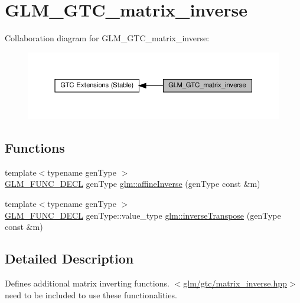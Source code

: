 \hypertarget{group__gtc__matrix__inverse}{}\section{G\+L\+M\+\_\+\+G\+T\+C\+\_\+matrix\+\_\+inverse}
\label{group__gtc__matrix__inverse}
Collaboration diagram for G\+L\+M\+\_\+\+G\+T\+C\+\_\+matrix\+\_\+inverse\+:\nopagebreak
\begin{figure}[H]
\begin{center}
\leavevmode
\includegraphics[width=350pt]{group__gtc__matrix__inverse}
\end{center}
\end{figure}
\subsection*{Functions}
\begin{DoxyCompactItemize}
\item 
{\footnotesize template$<$typename gen\+Type $>$ }\\\hyperlink{setup_8hpp_ab2d052de21a70539923e9bcbf6e83a51}{G\+L\+M\+\_\+\+F\+U\+N\+C\+\_\+\+D\+E\+CL} gen\+Type \hyperlink{group__gtc__matrix__inverse_gae0fcc5fc8783291f9702272de428fa0e}{glm\+::affine\+Inverse} (gen\+Type const \&m)
\item 
{\footnotesize template$<$typename gen\+Type $>$ }\\\hyperlink{setup_8hpp_ab2d052de21a70539923e9bcbf6e83a51}{G\+L\+M\+\_\+\+F\+U\+N\+C\+\_\+\+D\+E\+CL} gen\+Type\+::value\+\_\+type \hyperlink{group__gtc__matrix__inverse_gac23f1be9db49b929cc74e40f17f48593}{glm\+::inverse\+Transpose} (gen\+Type const \&m)
\end{DoxyCompactItemize}


\subsection{Detailed Description}
Defines additional matrix inverting functions. $<$\hyperlink{matrix__inverse_8hpp}{glm/gtc/matrix\+\_\+inverse.\+hpp}$>$ need to be included to use these functionalities. 

